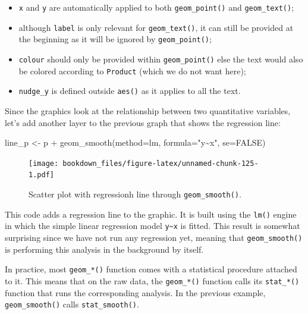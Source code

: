 \documentclass[
]{krantz}
\makeatletter
\newenvironment{Shaded}{\begin{snugshade}}{\end{snugshade}}
\newcommand{\AttributeTok}[1]{\textcolor[rgb]{0.61,0.61,0.61}{#1}}
\newcommand{\ConstantTok}[1]{\textcolor[rgb]{0,0,0}{#1}}
\newcommand{\FunctionTok}[1]{\textcolor[rgb]{0,0,0}{#1}}
\newcommand{\NormalTok}[1]{#1}
\newcommand{\OtherTok}[1]{\textcolor[rgb]{0.37,0.37,0.37}{#1}}
\newcommand{\SpecialCharTok}[1]{\textcolor[rgb]{0,0,0}{#1}}
\newcommand{\StringTok}[1]{\textcolor[rgb]{0.5,0.5,0.5}{#1}}
\providecommand{\tightlist}{%
  \setlength{\itemsep}{0pt}\setlength{\parskip}{0pt}}
\newenvironment{kframe}{%
\medskip{}
\setlength{\fboxsep}{.8em}
 \def\at@end@of@kframe{}%
 \ifinner\ifhmode%
  \def\at@end@of@kframe{\end{minipage}}%
  \begin{minipage}{\columnwidth}%
 \fi\fi%
 \def\FrameCommand##1{\hskip\@totalleftmargin \hskip-\fboxsep
 \colorbox{shadecolor}{##1}\hskip-\fboxsep
     \hskip-\linewidth \hskip-\@totalleftmargin \hskip\columnwidth}%
 \MakeFramed {\advance\hsize-\width
   \@totalleftmargin\z@ \linewidth\hsize
   \@setminipage}}%
 {\par\unskip\endMakeFramed%
 \at@end@of@kframe}
\renewenvironment{Shaded}{\begin{kframe}}{\end{kframe}}
\makeatother
\begin{document}
\begin{itemize}
\tightlist
\item
  \texttt{x} and \texttt{y} are automatically applied to both \texttt{geom\_point()} and \texttt{geom\_text()};
\item
  although \texttt{label} is only relevant for \texttt{geom\_text()}, it can still be provided at the beginning as it will be ignored by \texttt{geom\_point()};
\item
  \texttt{colour} should only be provided within \texttt{geom\_point()} else the text would also be colored according to \texttt{Product} (which we do not want here);
\item
  \texttt{nudge\_y} is defined outside \texttt{aes()} as it applies to all the text.
\end{itemize}

Since the graphics look at the relationship between two quantitative variables, let's add another layer to the previous graph that shows the regression line:

\begin{Shaded}
\begin{Highlighting}[]
\NormalTok{line\_p }\OtherTok{\textless{}{-}}\NormalTok{ p }\SpecialCharTok{+}
  \FunctionTok{geom\_smooth}\NormalTok{(}\AttributeTok{method=}\NormalTok{lm, }\AttributeTok{formula=}\StringTok{"y\textasciitilde{}x"}\NormalTok{, }\AttributeTok{se=}\ConstantTok{FALSE}\NormalTok{)}
\end{Highlighting}
\end{Shaded}

\begin{figure}
\centering
\texttt{[image: bookdown\_files/figure-latex/unnamed-chunk-125-1.pdf]}
\caption{\label{fig:unnamed-chunk-125}Scatter plot with regressionh line through \texttt{geom\_smooth()}.}
\end{figure}

This code adds a regression line to the graphic. It is built using the \texttt{lm()} engine in which the simple linear regression model \texttt{y\textasciitilde{}x} is fitted. This result is somewhat surprising since we have not run any regression yet, meaning that \texttt{geom\_smooth()} is performing this analysis in the background by itself.

In practice, most \texttt{geom\_*()} function comes with a statistical procedure attached to it. This means that on the raw data, the \texttt{geom\_*()} function calls its \texttt{stat\_*()} function that runs the corresponding analysis. In the previous example, \texttt{geom\_smooth()} calls \texttt{stat\_smooth()}.
\end{document}
